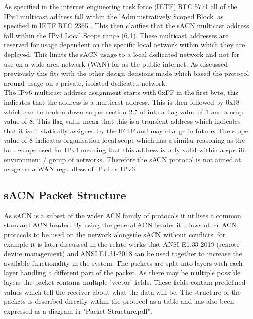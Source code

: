 \documentclass[11pt,a4paper]{article}
\begin{document}
As specified in the internet engineering task force (IETF) RFC 5771 \cite{IETF_RFC_5771} all of the IPv4 multicast address fall within the 'Administratively Scoped Block' as specified in IETF RFC 2365 \cite{IETF_RFC_2365}. This then clarifies that the sACN multicast address fall within the IPv4 Local Scope range (6.1). These multicast addresses are reserved for usage dependent on the specific local network within which they are deployed. This limits the sACN usage to a local dedicated network and not for use on a wide area network (WAN) for as the public internet. As discussed previously this fits with the other design decisions made which based the protocol around usage on a private, isolated dedicated network.\\

The IPv6 multicast address assignment starts with 0xFF in the first byte, this indicates that the address is a multicast address. This is then followed by 0x18 which can be broken down as per section 2.7 of \cite{IETF_RFC_4291} into a flag value of 1 and a scop value of 8. This flag value mean that this is a transient address which indicates that it isn't statically assigned by the IETF and may change in future. The scope value of 8 indicates organisation-local scope which has a similar reasoning as the local-scope used for IPv4 meaning that this address is only valid within a specific environment / group of networks. Therefore the sACN protocol is not aimed at usage on a WAN regardless of IPv4 or IPv6. 

\subsection{sACN Packet Structure}
As sACN is a subset of the wider ACN family of protocols it utilises a common standard ACN header. By using the general ACN header it allows other ACN protocols to be used on the network alongside sACN without conflicts, for example it is later discussed in the relate works that ANSI E1.33-2019 (remote device management) and ANSI E1.31-2018 can be used together to increase the available functionality in the system. The packets are split into layers with each layer handling a different part of the packet. As there may be multiple possible layers the packet contains multiple 'vector' fields. These fields contain predefined values which tell the receiver about what the data will be. The structure of the packets is described directly within the protocol as a table and has also been expressed as a diagram in "Packet-Structure.pdf".
\end{document}
